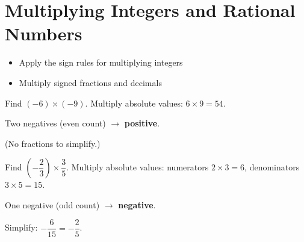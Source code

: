 \section{Multiplying Integers and Rational Numbers}

\begin{stepGoal}
\begin{itemize}
    \item Apply the sign rules for multiplying integers
    \item Multiply signed fractions and decimals
\end{itemize}
\end{stepGoal}

\begin{stepVocabBox}
\end{stepVocabBox}

\begin{stepsCard}
\end{stepsCard}

\begin{stepExample}{Find $(-6) \times (-9)$.}
     Multiply absolute values: $6 \times 9 = 54$.

     Two negatives (even count) $\to$ \textbf{positive}.

     (No fractions to simplify.)
\end{stepExample}

\begin{stepExample}{Find $\left(-\dfrac{2}{3}\right) \times \dfrac{3}{5}$.}
     Multiply absolute values: numerators $2 \times 3 = 6$, denominators $3 \times 5 = 15$.

     One negative (odd count) $\to$ \textbf{negative}.

     Simplify: $-\dfrac{6}{15} = -\dfrac{2}{5}$.
\end{stepExample}

